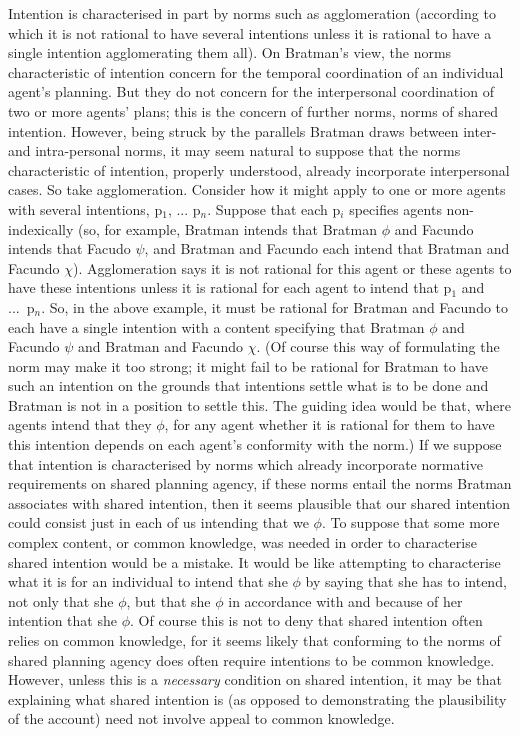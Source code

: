 \documentclass[12pt,letterpaper]{extarticle}
\begin{document}
Intention is characterised in part by norms such as agglomeration (according to which it is not rational to have several intentions unless it is rational to have a single intention agglomerating them all).
On Bratman's view, the norms characteristic of intention concern for the temporal coordination of an individual agent's planning.
But they do not concern for the interpersonal coordination of two or more agents' plans; this is the concern of further norms, norms of shared intention.
However, being struck by the parallels Bratman draws between inter- and intra-personal norms, it may seem natural to suppose that the norms characteristic of intention, properly understood, already incorporate interpersonal cases.
So take agglomeration.
Consider how it might apply to one or more agents with several intentions, p$_1$, ... p$_n$.
Suppose that each p$_i$ specifies agents non-indexically (so, for example, Bratman intends that Bratman $\phi$ and Facundo intends that Facudo $\psi$, and Bratman and Facundo each intend that Bratman and Facundo $\chi$).
Agglomeration says it is not rational for this agent or these agents to have these intentions unless it is rational for each agent to intend that p$_1$ and ...\ p$_n$.  
So, in the above example, it must be rational for Bratman and Facundo to each have a single intention with a content specifying that Bratman $\phi$ and Facundo $\psi$ and Bratman and Facundo $\chi$.
(Of course this way of formulating the norm may make it too strong; it might fail to be rational for Bratman to have such an intention on the grounds that intentions settle what is to be done and Bratman is not in a position to settle this.
The guiding idea would be that, where agents intend that they $\phi$, for any agent whether it is rational for them to have this intention depends on each agent's conformity with the norm.)
If we suppose that intention is characterised by norms which already incorporate normative requirements on shared planning agency, if these norms entail the norms Bratman associates with shared intention, then it seems plausible that our shared intention could consist just in each of us intending that we $\phi$.
To suppose that some more complex content, or common knowledge, was needed in order to characterise shared intention would be a mistake.
It would be like attempting to characterise what it is for an individual to intend that she $\phi$ by saying that she has to intend, not only that she $\phi$, but that she $\phi$ in accordance with and because of her intention that she $\phi$.
Of course this is not to deny that shared intention often relies on common knowledge, for it seems likely that conforming to the norms of shared planning agency does often require intentions to be common knowledge.
However, unless this is a \emph{necessary} condition on shared intention, it may be that explaining what shared intention is (as opposed to demonstrating the plausibility of the account) need not involve appeal to common knowledge.
\end{document}
